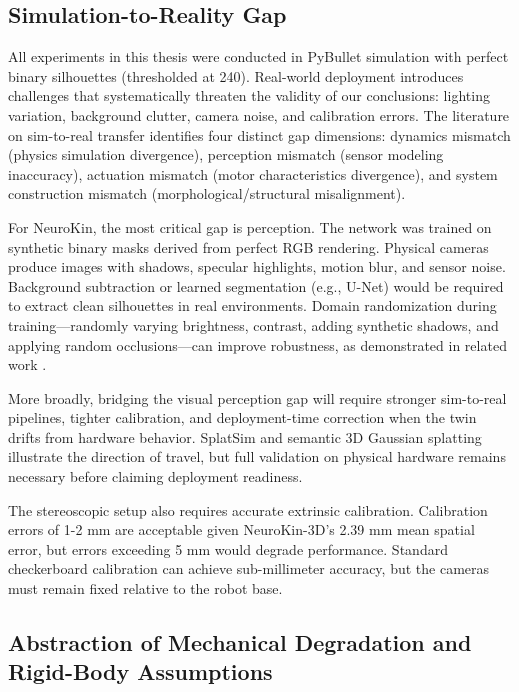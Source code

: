 \documentclass[12pt,a4paper,oneside]{report}
\begin{document}
\subsection{Simulation-to-Reality Gap}

All experiments in this thesis were conducted in PyBullet simulation with perfect binary silhouettes (thresholded at 240). Real-world deployment introduces challenges that systematically threaten the validity of our conclusions: lighting variation, background clutter, camera noise, and calibration errors. The literature on sim-to-real transfer \cite{tan2018simtoreal, aljalbout2026realitygap} identifies four distinct gap dimensions: dynamics mismatch (physics simulation divergence), perception mismatch (sensor modeling inaccuracy), actuation mismatch (motor characteristics divergence), and system construction mismatch (morphological/structural misalignment).

For NeuroKin, the most critical gap is perception. The network was trained on synthetic binary masks derived from perfect RGB rendering. Physical cameras produce images with shadows, specular highlights, motion blur, and sensor noise. Background subtraction or learned segmentation (e.g., U-Net) would be required to extract clean silhouettes in real environments. Domain randomization during training---randomly varying brightness, contrast, adding synthetic shadows, and applying random occlusions---can improve robustness, as demonstrated in related work \cite{rezvani2024robust, qiu2024swim2real}.

More broadly, bridging the visual perception gap will require stronger sim-to-real pipelines, tighter calibration, and deployment-time correction when the twin drifts from hardware behavior. SplatSim \cite{qureshi2025splatsim} and semantic 3D Gaussian splatting \cite{tang2025semantic} illustrate the direction of travel, but full validation on physical hardware remains necessary before claiming deployment readiness.

The stereoscopic setup also requires accurate extrinsic calibration. Calibration errors of 1-2 mm are acceptable given NeuroKin-3D's 2.39 mm mean spatial error, but errors exceeding 5 mm would degrade performance. Standard checkerboard calibration can achieve sub-millimeter accuracy, but the cameras must remain fixed relative to the robot base.

\subsection{Abstraction of Mechanical Degradation and Rigid-Body Assumptions}
\end{document}
